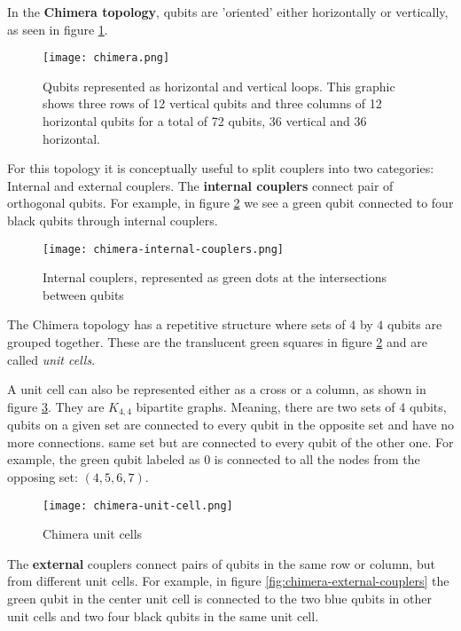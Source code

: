 In the \textbf{Chimera topology}, qubits are 'oriented' either horizontally or vertically, as seen in figure \ref{fig:chimera}.

\begin{figure}[h]
	\texttt{[image: chimera.png]}
	\centering
	\caption{Qubits represented as horizontal and vertical loops. This graphic shows three rows of 12 vertical qubits and three columns of 12 horizontal qubits for a total of 72 qubits, 36 vertical and 36 horizontal. \cite{DWaveDoc-Architecture}}
	\label{fig:chimera}
\end{figure}

For this topology it is conceptually useful to split couplers into two categories: Internal and external couplers. The \textbf{internal couplers} connect pair of orthogonal qubits. For example, in figure \ref{fig:chimera-internal-couplers} we see a green qubit connected to four black qubits through internal couplers.

\begin{figure}[H]
	\texttt{[image: chimera-internal-couplers.png]}
	\centering
	\caption{Internal couplers, represented as green dots at the intersections between qubits \cite{DWaveDoc-Architecture}}
	\label{fig:chimera-internal-couplers}
\end{figure}

The Chimera topology has a repetitive structure where sets of $4$ by $4$ qubits are grouped together. These are the translucent green squares in figure \ref{fig:chimera-internal-couplers} and are called \emph{unit cells}.

A unit cell can also be represented either as a cross or a column, as shown in figure \ref{fig:chimera-unit-cell}. They are $K_{4,4}$ bipartite graphs. Meaning, there are two sets of $4$ qubits, qubits on a given set are connected to every qubit in the opposite set and have no more connections. same set but are connected to every qubit of the other one. For example, the green qubit labeled as $0$ is connected to all the nodes from the opposing set: $(4,5,6,7)$.

\begin{figure}[h]
	\texttt{[image: chimera-unit-cell.png]}
	\centering
	\caption{Chimera unit cells \cite{DWaveDoc-Architecture}}
	\label{fig:chimera-unit-cell}
\end{figure}

The \textbf{external} couplers connect pairs of qubits in the same row or column, but from different unit cells. For example, in figure \ref{fig:chimera-external-couplers} the green qubit in the center unit cell is connected to the two blue qubits in other unit cells and two four black qubits in the same unit cell.

